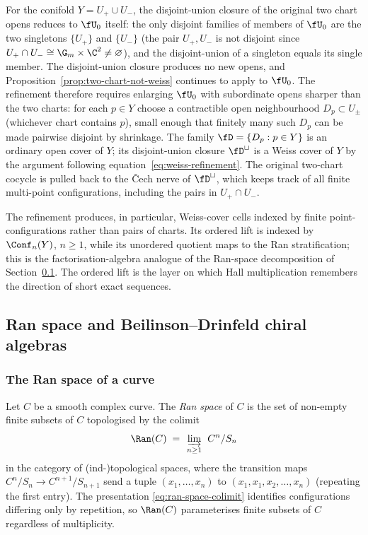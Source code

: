 \begin{remark}
\label{rem:weiss-refinement-conifold}
For the conifold $Y = U_+ \cup U_-$, the disjoint-union closure of the
original two chart opens reduces to $\fU_0$ itself:
the only disjoint families of members of $\fU_0$ are the two singletons
$\{U_+\}$ and $\{U_-\}$ (the pair $U_+, U_-$ is not disjoint since
$U_+ \cap U_- \cong \G_m \times \C^2 \ne \varnothing$), and the
disjoint-union of a singleton equals its single member. The
disjoint-union closure produces no new opens, and
Proposition~\ref{prop:two-chart-not-weiss} continues to apply to
$\fU_0$. The refinement therefore requires enlarging
$\fU_0$ with subordinate opens sharper than the two charts: for each
$p \in Y$ choose
a contractible open neighbourhood $D_p \subset U_\pm$ (whichever chart
contains $p$), small enough that finitely many such $D_p$ can be made
pairwise disjoint by shrinkage. The family $\fD = \{D_p : p \in Y\}$
is an ordinary open cover of $Y$; its disjoint-union closure $\fD^{\sqcup}$
is a Weiss cover of $Y$ by the argument following
equation~\eqref{eq:weiss-refinement}. The original two-chart cocycle
is pulled back to the \v{C}ech nerve of $\fD^{\sqcup}$, which keeps
track of all finite multi-point configurations, including the pairs in
$U_+ \cap U_-$.
\end{remark}

The refinement produces, in particular, Weiss-cover cells indexed by
finite point-configurations rather than pairs of charts. Its ordered
lift is indexed by $\Conf_n(Y)$, $n \geq 1$, while its unordered
quotient maps to the Ran stratification; this is the
factorisation-algebra analogue of the Ran-space decomposition of
Section~\ref{sec:fa-ran-bd}. The ordered lift is the layer on which
Hall multiplication remembers the direction of short exact sequences.

\subsection{Ran space and Beilinson--Drinfeld chiral algebras}
\label{sec:fa-ran-bd}

\subsubsection{The Ran space of a curve}

Let $C$ be a smooth complex curve. The \emph{Ran space} of $C$ is the
set of non-empty finite subsets of $C$ topologised by the colimit
\begin{equation}
\label{eq:ran-space-colimit}
 \Ran(C) \;=\; \varinjlim_{\, n \ge 1\,} \; C^n / S_n
\end{equation}
in the category of (ind-)topological spaces, where the transition maps
$C^n/S_n \to C^{n+1}/S_{n+1}$ send a tuple $(x_1, \dots, x_n)$ to
$(x_1, x_1, x_2, \dots, x_n)$ (repeating the first entry). The
presentation \eqref{eq:ran-space-colimit} identifies configurations
differing only by repetition, so $\Ran(C)$ parameterises finite subsets
of $C$ regardless of multiplicity.

